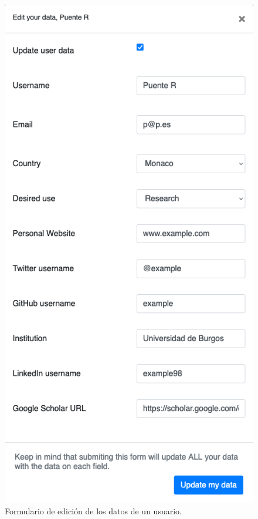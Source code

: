 \begin{figure}
\centering
\includegraphics[scale=0.5]{../img/anexos/manual-usuario/UBUMLaaS/edit-profile-data}
\caption{Formulario de edición de los datos de un usuario.}\label{fig:edit-profile-data}
\end{figure}

